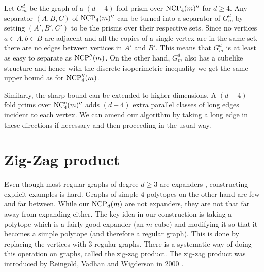 Let $G^d_m$ be the graph of a $(d-4)$-fold prism over $\textrm{NCP}_4(m)''$ for $d\geq 4$. 
Any separator 
$(A,B,C)$ of $\textrm{NCP}_4(m)''$ can be turned into a separator of $G^d_m$ by setting 
$(A',B',C')$ to be the prisms over their respective sets. Since no vertices 
$a\in A, b\in B$ are adjacent and all the copies of a single vertex are in the 
same set, there are no edges between vertices in $A'$ and $B'$. This means that 
$G^d_m$ is at least as easy to separate as $\textrm{NCP}''_4(m)$. On the other hand, $G^d_m$ 
also has a cubelike structure and hence with the discrete isoperimetric 
inequality we get the same upper bound as for $\textrm{NCP}''_4(m)$. 

Similarly, the sharp bound can be extended to higher dimensions. A $(d-4)$ fold
prims over $\mathrm{NC}^c_4(m)''$ adds $(d-4)$ extra parallel classes of long edges incident
to each vertex. We can amend our algorithm by taking a long edge in these directions 
if necessary and then proceeding in the usual way.

\section{Zig-Zag product}

Even though most regular graphs of degree $d\ge 3$ are expanders \cite{KoBa1967}, 
constructing explicit examples is hard. Graphs of simple 4-polytopes on the other hand
are few and far between. While our $\textrm{NCP}_d(m)$ are not expanders, they are not that  
far away from expanding either. The key idea in our construction is taking a polytope which
is a fairly good expander (an $m$-cube)
and modifying it so that it becomes a simple polytope (and therefore a regular graph). This
is done by replacing the vertices with 3-regular graphs. There is a systematic way of doing this operation
on graphs, called
the zig-zag product. The zig-zag product was introduced by Reingold, Vadhan and Wigderson in 2000 
\cite{892006}. 


